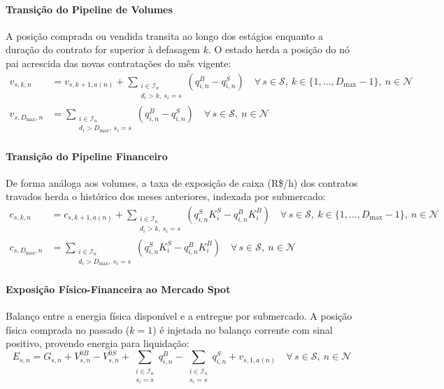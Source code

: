\documentclass[12pt, a4paper]{article}
\begin{document}
\paragraph{Transição do Pipeline de Volumes}
A posição comprada ou vendida transita ao longo dos estágios enquanto a duração do contrato for superior à defasagem $k$.
O estado herda a posição do nó pai acrescida das novas contratações do mês vigente:
\begin{align}
    v_{s,k,n} &= v_{s,k+1,a(n)} + \sum_{\substack{i \in \mathcal{I}_n \\ d_i > k,\ s_i = s}} \left(q_{i,n}^B - q_{i,n}^S\right)
    \quad \forall\, s \in \mathcal{S},\ k \in \{1,\dots,D_{\max}-1\},\ n \in \mathcal{N} \\
    v_{s,D_{\max},n} &= \sum_{\substack{i \in \mathcal{I}_n \\ d_i > D_{\max},\ s_i = s}} \left(q_{i,n}^B - q_{i,n}^S\right)
    \quad \forall\, s \in \mathcal{S},\ n \in \mathcal{N}
\end{align}

\paragraph{Transição do Pipeline Financeiro}
De forma análoga aos volumes, a taxa de exposição de caixa (R\$/h) dos contratos travados herda o histórico dos meses anteriores, indexada por submercado:
\begin{align}
    c_{s,k,n} &= c_{s,k+1,a(n)} + \sum_{\substack{i \in \mathcal{I}_n \\ d_i > k,\ s_i = s}} \left(q_{i,n}^S K_i^S - q_{i,n}^B K_i^B\right)
    \quad \forall\, s \in \mathcal{S},\ k \in \{1,\dots,D_{\max}-1\},\ n \in \mathcal{N} \\
    c_{s,D_{\max},n} &= \sum_{\substack{i \in \mathcal{I}_n \\ d_i > D_{\max},\ s_i = s}} \left(q_{i,n}^S K_i^S - q_{i,n}^B K_i^B\right)
    \quad \forall\, s \in \mathcal{S},\ n \in \mathcal{N}
\end{align}

\paragraph{Exposição Físico-Financeira ao Mercado Spot}
Balanço entre a energia física disponível e a entregue por submercado.
A posição física comprada no passado ($k=1$) é injetada no balanço corrente com sinal positivo, provendo energia para liquidação:
\begin{equation}
    E_{s,n} = G_{s,n} + V_{s,n}^{0B} - V_{s,n}^{0S}
              + \sum_{\substack{i \in \mathcal{I}_n \\ s_i = s}} q_{i,n}^B
              - \sum_{\substack{i \in \mathcal{I}_n \\ s_i = s}} q_{i,n}^S
              + v_{s,1,a(n)}
    \quad \forall\, s \in \mathcal{S},\ n \in \mathcal{N}
\end{equation}
\end{document}
